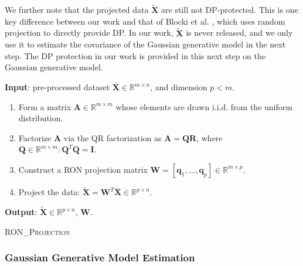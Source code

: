 \documentclass[USenglish,oneside,twocolumn]{article}
\newcommand{\noun}[1]{\textsc{#1}}
\theoremstyle{definition}
\theoremstyle{remark}
\theoremstyle{plain}
\theoremstyle{plain}
\begin{document}
We further note that the projected data $\widetilde{\mathbf{X}}$
are still not DP-protected. This is one key difference between our
work and that of Blocki et al. \cite{RefWorks:313}, which uses random
projection to directly provide DP. In our work, $\widetilde{\mathbf{X}}$
is never released, and we only use it to estimate the covariance of
the Gaussian generative model in the next step. The DP protection
in our work is provided in this next step on the Gaussian generative model.

\begin{algorithm}
{\small \par
\textbf{Input}{: pre-processed dataset $\bar{\mathbf{X}}\in\mathbb{R}^{m\times n}$,
and dimension $p<m$.
}{\par}
\vspace{0.5em}
\begin{enumerate}
\item {Form a matrix $\mathbf{A}\in\mathbb{R}^{m\times m}$ whose elements are drawn i.i.d. from the uniform distribution.}{\par}
\item {Factorize $\mathbf{A}$ via the QR factorization as $\mathbf{A}=\mathbf{Q}\mathbf{R}$,
where $\mathbf{Q}\in\mathbb{R}^{m\times m}:\mathbf{Q}^{T}\mathbf{Q}=\mathbf{I}$.}{\par}
\item {Construct a RON projection matrix $\mathbf{W}=[\mathbf{q}_{1},\ldots,\mathbf{q}_{p}]\in\mathbb{R}^{m\times p}$.}{ \par}
\item {Project the data: $\widetilde{\mathbf{X}}=\mathbf{W}^{T}\bar{\mathbf{X}}\in\mathbb{R}^{p\times n}$.\vspace{-0.5em}
}{\par}
\end{enumerate}
\textbf{Output}{: $\widetilde{\mathbf{X}}\in\mathbb{R}^{p\times n}$,
$\mathbf{W}$.}{ \par}
}
\caption{\noun{RON\_Projection \label{alg:RON_Projection}}}

\end{algorithm}

\vspace{-1em}
\subsubsection{Gaussian Generative Model Estimation}
\end{document}
